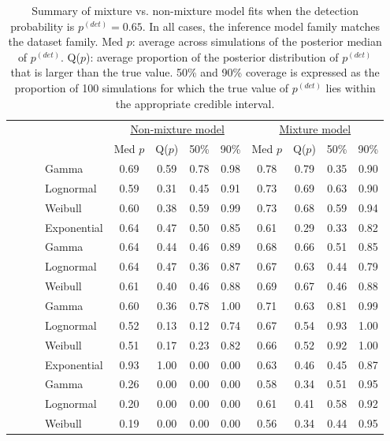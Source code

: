 \documentclass[useAMS,usenatbib,referee,12pt]{article}
\newcommand{\pdet}{p^{(det)}}
\begin{document}
\begin{table}[ht]
\vspace{1.2cm}

\begin{tabular}{l|l|l|l|cccc|cccc}
 \multicolumn{4}{c|}{ } & \multicolumn{4}{c|}{\underline{Non-mixture model}} & \multicolumn{4}{c}{\underline{Mixture model}} \\
 \multicolumn{4}{c|}{ } & Med $p$ & Q($p$) & 50\% & 90\% & Med $p$ & Q($p$) & 50\% & 90\% \\ 
  \hline
  \hline
 \parbox[t]{2mm}{} & \parbox[t]{2mm}{} & \parbox[t]{2mm}{}& Gamma & 0.69 & 0.59 & 0.78 & 0.98 & 0.78 & 0.79 & 0.35 & 0.90 \\ 
   &  &  & Lognormal & 0.59 & 0.31 & 0.45 & 0.91 & 0.73 & 0.69 & 0.63 & 0.90 \\ 
   &  &  & Weibull & 0.60 & 0.38 & 0.59 & 0.99 & 0.73 & 0.68 & 0.59 & 0.94 \\
   &  &  & Exponential & 0.64 & 0.47 & 0.50 & 0.85 & 0.61 & 0.29 & 0.33 & 0.82 \\ 
 & & \parbox[t]{2mm}{}& Gamma & 0.64 & 0.44 & 0.46 & 0.89 & 0.68 & 0.66 & 0.51 & 0.85 \\ 
   &  &  & Lognormal & 0.64 & 0.47 & 0.36 & 0.87 & 0.67 & 0.63 & 0.44 & 0.79 \\ 
   &  &  & Weibull & 0.61 & 0.40 & 0.46 & 0.88 & 0.69 & 0.67 & 0.46 & 0.88 \\ 
& \parbox[t]{2mm}{} & \parbox[t]{2mm}{}& Gamma & 0.60 & 0.36 & 0.78 & 1.00 & 0.71 & 0.63 & 0.81 & 0.99 \\ 
   &  &  & Lognormal & 0.52 & 0.13 & 0.12 & 0.74 & 0.67 & 0.54 & 0.93 & 1.00 \\ 
   &  &  & Weibull & 0.51 & 0.17 & 0.23 & 0.82 & 0.66 & 0.52 & 0.92 & 1.00 \\ 
   &  &  & Exponential & 0.93 & 1.00 & 0.00 & 0.00 & 0.63 & 0.46 & 0.45 & 0.87 \\ 
 & & \parbox[t]{2mm}{} & Gamma & 0.26 & 0.00 & 0.00 & 0.00 & 0.58 & 0.34 & 0.51 & 0.95 \\ 
   &  &  & Lognormal & 0.20 & 0.00 & 0.00 & 0.00 & 0.61 & 0.41 & 0.58 & 0.92 \\ 
   &  &  & Weibull & 0.19 & 0.00 & 0.00 & 0.00 & 0.56 & 0.34 & 0.44 & 0.95 \\ 
   \hline
\end{tabular}
\caption{Summary of mixture vs. non-mixture model fits when the detection probability is $\pdet =0.65$.  
In all cases, the inference model family matches the dataset family.  
Med $p$: average across simulations of the posterior median of $\pdet$.  
Q($p$): average proportion of the posterior distribution of $\pdet$ that is larger than the true value.  
50\% and 90\% coverage is expressed as the proportion of 100 simulations for which the true value of $\pdet$ lies within the appropriate credible interval.}


\end{table}
\end{document}
